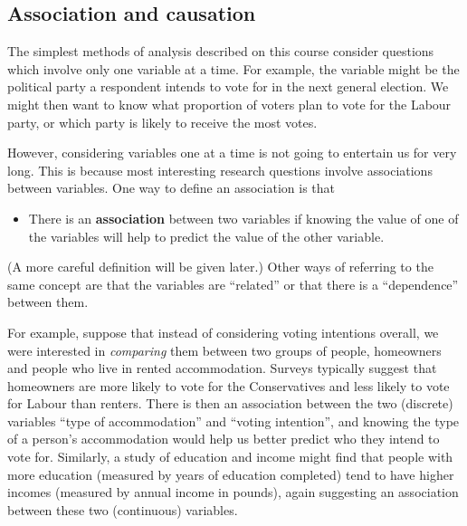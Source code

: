\subsection{Association and causation}
\label{ss_intro_def_assoc}

The simplest methods of analysis described on this course consider
questions which involve only one variable at a time. For example, the
variable might be the political party a respondent intends to vote for
in the next general election. We might then want to know what proportion
of voters plan to vote for the Labour party, or which party is likely
to receive the most votes.

However,
considering variables one at a time is not going
to entertain us for very long. This is
because most interesting research questions involve associations between
variables. One way to define an association is
that
\begin{itemize}
\item
There is an \textbf{association} between two variables if knowing the
value of one of the variables will help to predict the value of the
other variable.
\end{itemize}
(A more careful definition will be given later.)
Other ways of referring to the same concept are that the variables are
``related'' or that there is a ``dependence'' between them.

For example, suppose that instead of considering voting intentions
overall, we were interested in \emph{comparing} them between two groups
of people, homeowners and people who live in rented accommodation.
Surveys typically suggest that homeowners are more likely to vote for
the Conservatives and less likely to vote for Labour than renters. There
is then an association between the two (discrete) variables ``type of
accommodation'' and ``voting intention'', and knowing the type of a
person's accommodation would help us better predict who they intend to
vote for. Similarly, a study of education and income might find that
people with more education (measured by years of education completed)
tend to have higher incomes (measured by annual income in pounds), again
suggesting an association between these two (continuous) variables.

